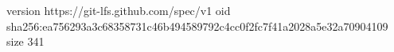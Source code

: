 version https://git-lfs.github.com/spec/v1
oid sha256:ea756293a3c68358731c46b494589792c4cc0f2fc7f41a2028a5e32a70904109
size 341
